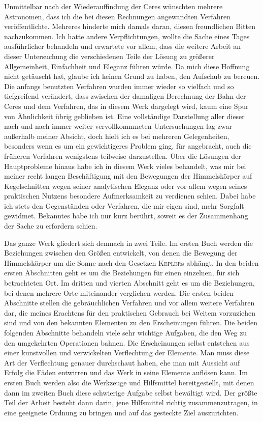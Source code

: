 Unmittelbar nach der Wiederauffindung der Ceres wünschten mehrere Astronomen, dass ich die bei diesen Rechnungen angewandten Verfahren veröffentlichte. Mehreres hinderte mich damals daran, diesen freundlichen Bitten nachzukommen. Ich hatte andere Verpflichtungen, wollte die Sache eines Tages ausführlicher behandeln und erwartete vor allem, dass die weitere Arbeit an dieser Untersuchung die verschiedenen Teile der Lösung zu größerer Allgemeinheit, Einfachheit und Eleganz führen würde. Da mich diese Hoffnung nicht getäuscht hat, glaube ich keinen Grund zu haben, den Aufschub zu bereuen. Die anfangs benutzten Verfahren wurden immer wieder so vielfach und so tiefgreifend verändert, dass zwischen der damaligen Berechnung der Bahn der Ceres und dem Verfahren, das
in diesem Werk dargelegt wird, kaum eine Spur von Ähnlichkeit übrig geblieben ist. Eine vollständige Darstellung aller dieser nach und nach immer weiter vervollkommneten Untersuchungen lag zwar außerhalb meiner Absicht, doch hielt ich es bei mehreren Gelegenheiten, besonders wenn es um ein gewichtigeres Problem ging, für angebracht, auch die früheren Verfahren wenigstens teilweise darzustellen. Über die Lösungen der Hauptprobleme hinaus habe ich in diesem Werk vieles behandelt, was mir bei meiner recht langen Beschäftigung mit den Bewegungen der Himmelskörper auf Kegelschnitten wegen seiner analytischen Eleganz oder vor allem wegen seines praktischen Nutzens besondere Aufmerksamkeit zu verdienen schien. Dabei habe ich stets den Gegenständen oder Verfahren, die mir eigen sind, mehr Sorgfalt gewidmet. Bekanntes habe ich nur kurz berührt, soweit es der Zusammenhang der Sache zu erfordern schien.

Das ganze Werk gliedert sich demnach in zwei Teile. Im ersten Buch werden die Beziehungen zwischen den Größen entwickelt, von denen die Bewegung der Himmelskörper um die Sonne nach den Gesetzen \textsc{Kepler}s abhängt. In den beiden ersten Abschnitten geht es um die Beziehungen für einen einzelnen, für sich betrachteten Ort. Im dritten und vierten Abschnitt geht es um die Beziehungen, bei denen mehrere Orte miteinander verglichen werden. Die ersten beiden Abschnitte stellen die gebräuchlichen Verfahren und vor allem weitere Verfahren dar, die meines Erachtens für den praktischen Gebrauch bei Weitem vorzuziehen sind und von den bekannten Elementen zu den Erscheinungen führen. Die beiden folgenden Abschnitte behandeln viele sehr wichtige Aufgaben, die den Weg zu den umgekehrten Operationen bahnen. Die Erscheinungen selbst entstehen aus einer kunstvollen und verwickelten Verflechtung der Elemente. Man muss diese Art der Verflechtung genauer durchschaut haben, ehe man mit Aussicht auf Erfolg die Fäden entwirren und das Werk in seine Elemente auflösen kann. Im ersten Buch werden also die Werkzeuge und Hilfsmittel bereitgestellt, mit denen dann im zweiten Buch diese schwierige Aufgabe selbst bewältigt wird. Der größte Teil der Arbeit besteht dann darin, jene Hilfsmittel richtig zusammenzutragen, in eine geeignete Ordnung zu bringen und auf das gesteckte Ziel auszurichten.

